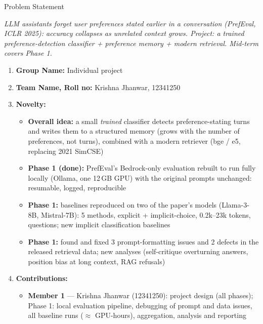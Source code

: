 \documentclass[aspectratio=141,10pt]{beamer}
\begin{document}
\begin{frame}
\begin{center}{\color{black}\LARGE Problem Statement}\end{center}
\vspace{2pt}
{\small\itshape LLM assistants forget user preferences stated earlier in a conversation (PrefEval, ICLR 2025): accuracy collapses as
unrelated context grows. Project: a trained preference-detection classifier + preference memory + modern retrieval.
Mid-term covers Phase 1.\par}
\vspace{6pt}
\small
\begin{enumerate}
  \setlength{\itemsep}{4pt}
  \item[1)] \textbf{Group Name:} Individual project
  \item[2)] \textbf{Team Name, Roll no:} Krishna Jhanwar, 12341250
  \item[3)] \textbf{Novelty:}
  \begin{itemize}\setlength{\itemsep}{1pt}\footnotesize
    \item \textbf{Overall idea:} a small \emph{trained} classifier detects preference-stating turns and writes them to a structured
          memory (grows with the number of preferences, not turns), combined with a modern retriever (bge / e5, replacing 2021 SimCSE)
    \item \textbf{Phase 1 (done):} PrefEval's Bedrock-only evaluation rebuilt to run fully locally (Ollama, one 12\,GB GPU)
          with the original prompts unchanged: resumable, logged, reproducible
    \item \textbf{Phase 1:} baselines reproduced on two of the paper's models (Llama-3-8B, Mistral-7B): 5 methods,
          explicit + implicit-choice, 0.2k--23k tokens, \nQuestions{} questions; new implicit classification baselines
    \item \textbf{Phase 1:} found and fixed 3 prompt-formatting issues and 2 defects in the released retrieval data; new analyses
          (self-critique overturning answers, position bias at long context, RAG refusals)
  \end{itemize}
  \item[4)] \textbf{Contributions:}
  \begin{itemize}\setlength{\itemsep}{1pt}\footnotesize
    \item[] \textbf{Member 1} --- Krishna Jhanwar (12341250): project design (all phases); Phase 1: local evaluation pipeline,
            debugging of prompt and data issues, all baseline runs ($\approx$\gpuHours{} GPU-hours), aggregation, analysis and reporting
  \end{itemize}
\end{enumerate}
\end{frame}
\end{document}

